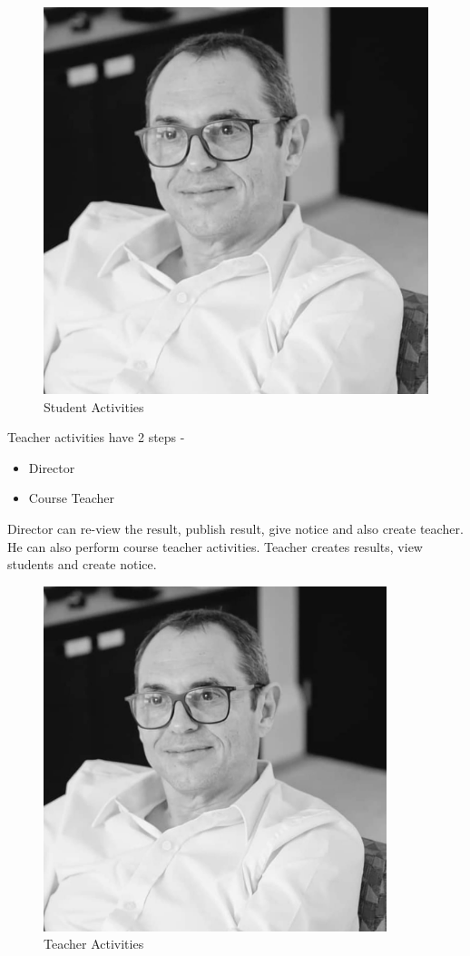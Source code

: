\documentclass{scrreprt}
\begin{document}
\begin{figure}[h!]
    \centering
    \includegraphics[width=15cm]{ricardo.jpg}
    \caption{Student Activities}
    \label{fig:Students Activites}
\end{figure}
\newpage
Teacher activities have 2 steps - 
\begin{itemize}
    \item Director
    \item Course Teacher
\end{itemize}
Director can re-view the result, publish result, give notice and also create teacher. He can also perform course teacher activities.
\newline
Teacher creates results, view students and create notice.
\newline
\begin{figure}[h!]
    \centering
    \includegraphics[width=10cm]{ricardo.jpg}
    \caption{Teacher Activities}
    \label{fig:Teacher Activities}
\end{figure}
\end{document}
